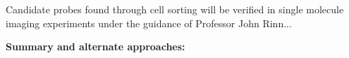 Candidate probes found through cell sorting will be verified in single molecule imaging experiments under the guidance of Professor John Rinn... 

\textbf{Summary and alternate approaches:}

